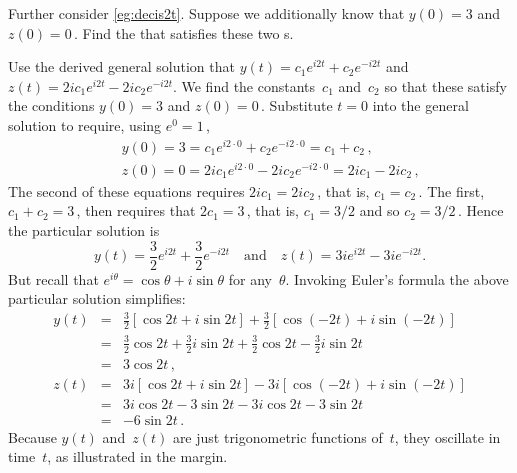 \begin{example} \label{eg:decis2tb} 
Further consider \autoref{eg:decis2t}.
Suppose we additionally know that \(y(0)=3\) and \(z(0)=0\)\,.  
Find the  that satisfies these two s.
\begin{solution} 
Use the derived general solution that \(y(t)=c_1e^{i2t}+c_2e^{-i2t}\) and \(z(t)=2ic_1e^{i2t}-2ic_2e^{-i2t}\).
We find the constants~\(c_1\) and~\(c_2\) so that these satisfy the  conditions \(y(0)=3\) and \(z(0)=0\)\,.
Substitute \(t=0\) into the general solution to require, using \(e^0=1\)\,,
\begin{eqnarray*}
&&y(0)=3=c_1e^{i2\cdot0}+c_2e^{-i2\cdot0}=c_1+c_2\,,
\\&&z(0)=0=2ic_1e^{i2\cdot0}-2ic_2e^{-i2\cdot0}=2ic_1-2ic_2\,,
\end{eqnarray*}
The second of these equations requires \(2ic_1=2ic_2\)\,, that is, \(c_1=c_2\)\,.
The first, \(c_1+c_2=3\)\,, then requires that \(2c_1=3\)\,, that is, \(c_1=3/2\) and so \(c_2=3/2\)\,.
Hence the particular solution is
\begin{equation*}
y(t)=\frac32e^{i2t}+\frac32e^{-i2t} 
\quad\text{and}\quad
z(t)=3ie^{i2t}-3ie^{-i2t}.
\end{equation*}
But recall  that \(e^{i\theta}=\cos\theta+i\sin\theta\) for any~\(\theta\).
Invoking Euler's formula the above particular solution simplifies:
%
\begin{eqnarray*}
y(t)&=&\frac32[\cos2t+i\sin2t]+\frac32[\cos(-2t)+i\sin(-2t)]
\\&=&\frac32\cos2t+\frac32i\sin2t+\frac32\cos2t-\frac32i\sin2t
\\&=&3\cos2t\,,
\\z(t)&=&3i[\cos2t+i\sin2t]-3i[\cos(-2t)+i\sin(-2t)]
\\&=&3i\cos2t-3\sin2t-3i\cos2t-3\sin2t
\\&=&-6\sin2t\,.
\end{eqnarray*}
Because \(y(t)\) and~\(z(t)\) are just trigonometric functions of~\(t\), they oscillate in time~\(t\), as illustrated in the margin.
\end{solution}
\end{example}



